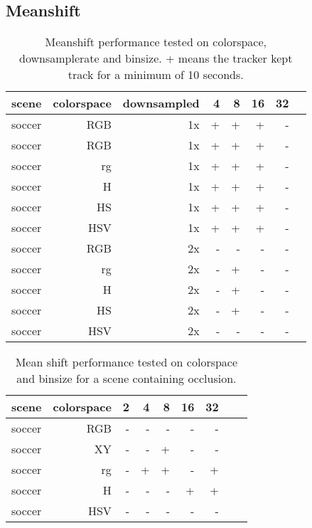 \documentclass[a4paper,11pt]{article}
\begin{document}
	\subsection{Meanshift} 

	\begin{table}
		\centering
		\caption{Meanshift performance tested on colorspace, downsamplerate and
		binsize. + means the tracker kept track for a minimum of 10 seconds.}

		\begin{tabular}{l*{7}{r|}}
			\label{table:fase1}
			scene	& 	colorspace	& downsampled 		   	& 4 & 8 & 16 & 32\\
			\hline
			soccer 	& 	RGB	 		& 1x		  			  & + & + & +  &  -\\
			soccer 	& 	RGB	 		& 1x		  			  & + & + & +  &  -\\
			soccer 	& 	rg	 		& 1x 		  			  & + & + & +  &  -\\
			soccer 	& 	H	 		& 1x		 			  & + & + & +  &  -\\
			soccer 	& 	HS	 		& 1x		  			  & + & + & +  &  -\\
			soccer 	& 	HSV	 		& 1x		  			  & + & + & +  &  -\\
			soccer 	& 	RGB	 		& 2x		  			  & - & - & -  &  -\\
			soccer 	& 	rg	 		& 2x 		  			  & - & + & -  &  -\\
			soccer 	& 	H	 		& 2x		  			  & - & + & -  &  -\\
			soccer 	& 	HS	 		& 2x		  			  & - & + & -  &  -\\
			soccer 	& 	HSV	 		& 2x		  			  & - & - & -  &  -\\
		\end{tabular}	
	\end{table}

	\begin{table}
		\centering
		\caption{Mean shift performance tested on colorspace and binsize for a
		scene containing occlusion.} 
		\begin{tabular}{l*{8}{r|}}
			scene	& 	colorspace	&  2 & 4 & 8 & 16 & 32\\
			\hline
			soccer 	& 	RGB	 		&  - & - & - & - & -\\
			soccer 	& 	XY	 		&  - & - & + & - & -\\
			soccer 	& 	rg	 		&  - & + & + & - & +\\
			soccer 	& 	H	 		&  - & - & - & + & +\\
			soccer 	& 	HSV	 		&  - & - & - & - & -\\ 
		\end{tabular}	
	\end{table}	
\end{document}
